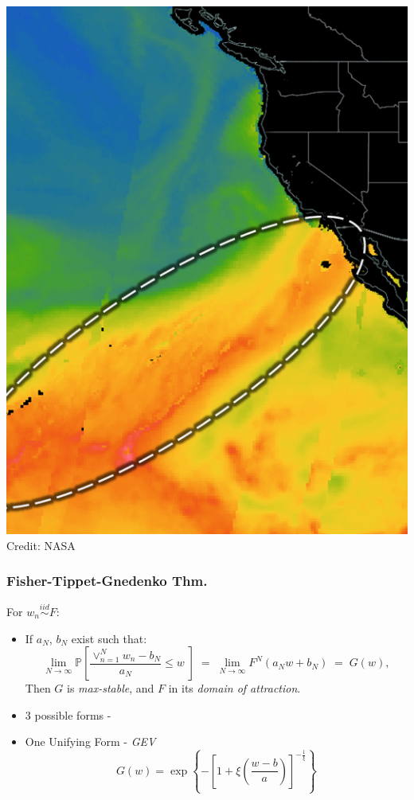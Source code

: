 \documentclass[aspectratio=169,10pt]{beamer}
\begin{document}
\begin{frame}
\begin{minipage}{.35\textwidth}
    \includegraphics[width=\textwidth]{./ch1/images/ar}\\
    {\scriptsize Credit: NASA}
    \end{minipage}
\end{frame} %

\begin{frame}
    \frametitle{Fisher-Tippet-Gnedenko Thm.}
    For $w_n \stackrel{iid}{\sim} F$:
    \begin{itemize}
    \item If $a_N$, $b_N$ exist such that:
    \[
        \lim\limits_{N\to\infty} \mathbb{P}
            \left[\frac{\vee_{n=1}^N w_n - b_N}{a_N} \leq w\;\right] 
                \;=\; \lim\limits_{N\to\infty}F^N(a_Nw + b_N) 
                \;=\; G(w),
    \]
    Then $G$ is \emph{max-stable}, and $F$ in its \emph{domain of attraction}.
    \item 3 possible forms - \citet{frechet1927,fisher1928,gumbel1942}
    \item One Unifying Form - \emph{GEV} \citet{jenkinson1955}
    \[
        G(w) = \exp\left\lbrace-\left[
            1 + \xi\left(\frac{w - b}{a}\right)
            \right]^{-\frac{1}{\xi}}\right\rbrace
    \]
    \end{itemize}
\end{frame} %
\end{document}
